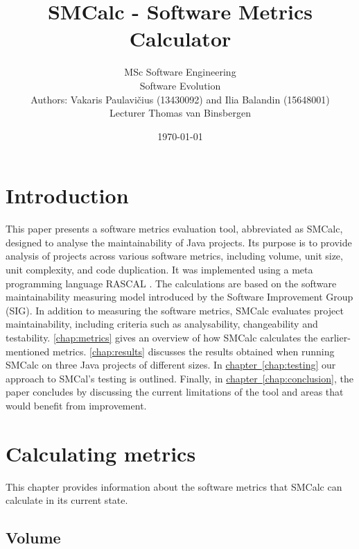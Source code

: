 \documentclass[11pt]{report}
\newcommand{\lnautoref}[1]{\hyperref[#1]{chapter~\ref{#1}}}
\begin{document}
\title{SMCalc - Software Metrics Calculator}
\author{MSc Software Engineering \\ Software Evolution \\ Authors: Vakaris Paulavičius (13430092) and Ilia Balandin (15648001) \\ Lecturer Thomas van Binsbergen}

\date{\vfill \today}
\maketitle
\thispagestyle{empty}
\newpage
\tableofcontents
\newpage

\chapter{Introduction}
\label{chap:introduction}

This paper presents a software metrics evaluation tool, abbreviated as SMCalc, designed to analyse the maintainability of Java projects. Its purpose is to provide analysis of projects across various software metrics, including volume, unit size, unit complexity, and code duplication. It was implemented using a meta programming language RASCAL \cite{Klint2009}. The calculations are based on the software maintainability measuring model \cite{Heitlager2007} introduced by the Software Improvement Group (SIG). In addition to measuring the software metrics, SMCalc evaluates project maintainability, including criteria such as analysability, changeability and testability. \autoref{chap:metrics} gives an overview of how SMCalc calculates the earlier-mentioned metrics. \autoref{chap:results} discusses the results obtained when running SMCalc on three Java projects of different sizes. In \lnautoref{chap:testing} our approach to SMCal's testing is outlined. Finally, in \lnautoref{chap:conclusion}, the paper concludes by discussing the current limitations of the tool and areas that would benefit from improvement.

\chapter{Calculating metrics}
\label{chap:metrics}

This chapter provides information about the software metrics that SMCalc can calculate in its current state.

\section{Volume}
\label{sec:volume}
\end{document}
